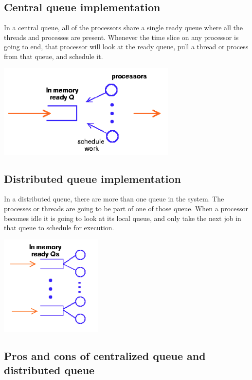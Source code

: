 \documentclass[twoside]{article}
\begin{document}
\subsection{Central queue implementation}
In a central queue, all of the processors share a single ready queue where all the threads and processes are present. Whenever the time slice on any processor is going to end, that processor will look at the ready queue, pull a thread or process from that queue, and schedule it. 

\begin{center}
  \includegraphics[scale=1]{central_queue.png}\\
\end{center} 

\subsection{Distributed queue implementation}
In a distributed queue, there are more than one queue in the system. The processes or threads are going to be part of one of those queue. When a processor becomes idle it is going to look at its local queue, and only take the next job in that queue to schedule for execution.

\begin{center}
  \includegraphics[scale=1]{distributed_queue.png}\\
\end{center} 

\subsection{Pros and cons of centralized queue and distributed queue}
\end{document}
